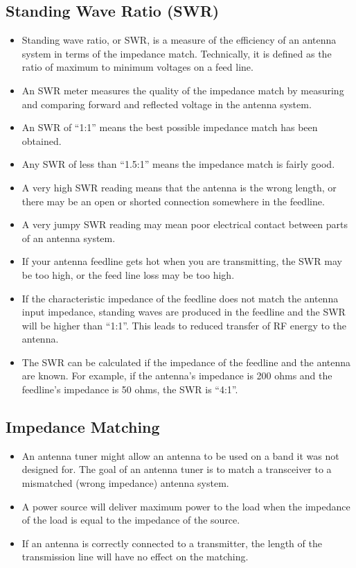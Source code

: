 \documentclass[letterpaper,12pt]{scrartcl}
\begin{document}
\subsection{Standing Wave Ratio (SWR)}

\begin{itemize}
\item Standing wave ratio, or SWR, is a measure of the efficiency of an antenna system in terms of the impedance match.
Technically, it is defined as the ratio of maximum to minimum voltages on a feed line.
\item An SWR meter measures the quality of the impedance match by measuring and comparing forward and reflected voltage in the antenna system.
\item An SWR of ``1:1'' means the best possible impedance match has been obtained.
\item Any SWR of less than ``1.5:1'' means the impedance match is fairly good.
\item A very high SWR reading means that the antenna is the wrong length, or there may be an open or shorted connection
somewhere in the feedline.
\item A very jumpy SWR reading may mean poor electrical contact between parts of an antenna system.
\item If your antenna feedline gets hot when you are transmitting, the SWR may be too high, or the feed line loss may be too high.
\item If the characteristic impedance of the feedline does not match the antenna input impedance, standing waves are produced in the feedline
and the SWR will be higher than ``1:1''. This leads to reduced transfer of RF energy to the antenna.
\item The SWR can be calculated if the impedance of the feedline and the antenna are known. For example, if the antenna's impedance is 200 ohms
and the feedline's impedance is 50 ohms, the SWR is ``4:1''.
\end{itemize}

\subsection{Impedance Matching}

\begin{itemize}
\item An antenna tuner might allow an antenna to be used on a band it was not designed for. 
The goal of an antenna tuner is to match a transceiver to a mismatched (wrong impedance) antenna system.
\item A power source will deliver maximum power to the load when the impedance of the load is equal
to the impedance of the source.
\item If an antenna is correctly connected to a transmitter, the length of the transmission line will have no effect on the matching.
\end{itemize}
\end{document}
